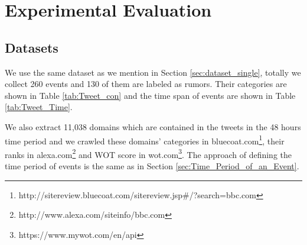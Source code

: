   \section{Experimental Evaluation}
  \subsection{Datasets} 
  We use the same dataset as we mention in Section \ref{sec:dataset_single}, totally we collect 260 events and 130 of them are labeled as rumors. Their 
  categories are shown in Table \ref{tab:Tweet_con} and the time span of events are shown in Table \ref{tab:Tweet_Time}.

  \begin{table}[!h]
 \centering
{}
 \caption{Categories Of Rumors And News}
 \label{tab:Tweet_con}
\end{table}
 
   We also extract 11,038 domains which are contained in the tweets in the 48 hours time period and we crawled these domains' categories in bluecoat.com\footnote{http://sitereview.bluecoat.com/sitereview.jsp\#/?search=bbc.com}, their ranks in alexa.com\footnote{http://www.alexa.com/siteinfo/bbc.com} and WOT score in wot.com\footnote{https://www.mywot.com/en/api}. The approach of defining the time period of events is the same as in Section \ref{sec:Time_Period_of_an_Event}.


\begin{table}[!h]
 \centering
{}
 \caption{Time Span of News and Rumors}
 \label{tab:Tweet_Time}
\end{table}


